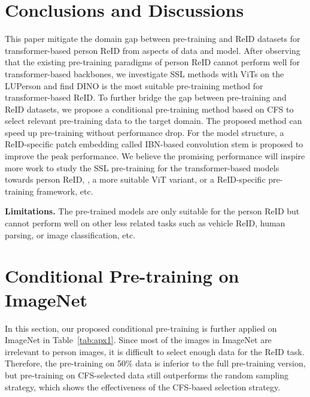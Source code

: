 \documentclass[10pt,twocolumn,letterpaper]{article}
\begin{document}
\section{Conclusions and Discussions}

This paper mitigate the domain gap between pre-training and ReID datasets for transformer-based person ReID from aspects of data and model. After observing that the existing pre-training paradigms of person ReID cannot perform well for transformer-based backbones, we investigate SSL methods with ViTs on the LUPerson and find DINO is the most suitable pre-training method for transformer-based ReID. To further bridge the gap between pre-training and ReID datasets, we propose a conditional pre-training method based on CFS to select relevant pre-training data to the target domain. The proposed method can speed up pre-training without performance drop. For the model structure, a ReID-specific patch embedding called IBN-based convolution stem is proposed to improve the peak performance. We believe the promising performance will inspire more work to study the SSL pre-training for the transformer-based models towards person ReID, \ie, a more suitable ViT variant, or a ReID-specific pre-training framework, etc. 

\textbf{Limitations.} The pre-trained models are only suitable for the person ReID but cannot perform well on other less related tasks such as vehicle ReID, human parsing, or image classification, etc.


{\small


}

\clearpage
\appendix
\section{Conditional Pre-training on ImageNet}

In this section,  our proposed conditional pre-training is further applied on ImageNet in Table~\ref{tab:apx1}. Since most of the images in ImageNet are irrelevant to person images, it is difficult to select enough data for the ReID task. Therefore, the pre-training on 50\% data is inferior to the full pre-training version, but pre-training on CFS-selected data still outperforms the random sampling strategy, which shows the effectiveness of the CFS-based selection strategy.
\end{document}
